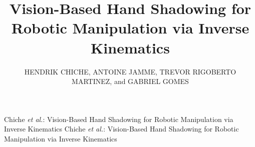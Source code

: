 \documentclass{ieeeaccess}
\begin{document}

\title{Vision-Based Hand Shadowing for Robotic Manipulation via Inverse Kinematics}

\author{\uppercase{Hendrik Chiche},
\uppercase{Antoine Jamme},
\uppercase{Trevor Rigoberto Martinez},
and \uppercase{Gabriel Gomes}}

\address[1]{University of California, Berkeley, CA 94720 USA (Capstone Project, Fung Institute for Engineering Leadership)}
\address[2]{OMGrab Inc. (e-mail: hendrik\_chiche@berkeley.edu, antoine\_jamme@berkeley.edu)}
\address[3]{University of California, Berkeley, Department of Mechanical Engineering, Berkeley, CA 94720 USA (e-mail: tre\_mart@berkeley.edu, gomes@berkeley.edu)}


\markboth
{Chiche \MakeLowercase{\textit{et al.}}: Vision-Based Hand Shadowing for Robotic Manipulation via Inverse Kinematics}
{Chiche \MakeLowercase{\textit{et al.}}: Vision-Based Hand Shadowing for Robotic Manipulation via Inverse Kinematics}

\end{document}

